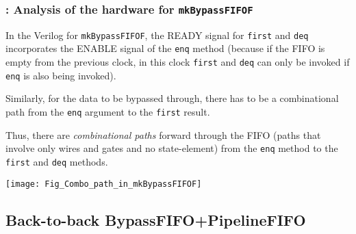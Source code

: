 \begin{frame}[fragile]
\frametitle{{\BSV}: Analysis of the hardware for {\tt mkBypassFIFOF}}

\footnotesize

In the Verilog for \verb|mkBypassFIFOF|, the READY signal
for \verb|first| and \verb|deq| incorporates the ENABLE signal of
the \verb|enq| method (because if the FIFO is empty from the previous
clock, in this clock \verb|first| and \verb|deq| can only be invoked
if \verb|enq| is also being invoked).

\vspace{2ex}

Similarly, for the data to be bypassed through, there has to be a
combinational path from the \verb|enq| argument to the \verb|first|
result.

\vspace{2ex}

Thus, there are \emph{combinational paths} forward through the FIFO
(paths that involve only wires and gates and no state-element) from
the \verb|enq| method to the \verb|first| and \verb|deq| methods.

\vspace{2ex}

\begin{center}
  \texttt{[image: Fig\_Combo\_path\_in\_mkBypassFIFOF]}
\end{center}

\end{frame}


\subsection{Back-to-back BypassFIFO+PipelineFIFO}


